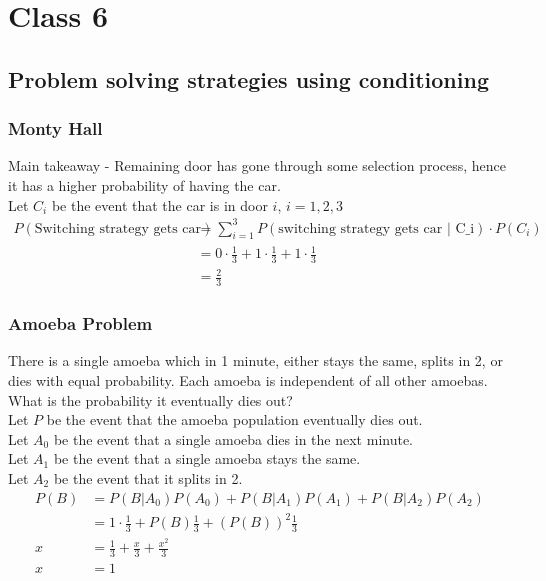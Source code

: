 \chapter{Class 6}

\section{Problem solving strategies using conditioning}

\subsection{Monty Hall}

Main takeaway - Remaining door has gone through some selection process, hence it has a higher probability of having the car. \\

Let $C_i$ be the event that the car is in door $i$, $i = 1, 2, 3$
\begin{align*}
   P(\text{Switching strategy gets car}) &= \sum_{i = 1}^{3}P(\text{switching strategy gets car | C_i}) \cdot P(C_i) \\
                                         &= 0 \cdot \frac{1}{3} + 1 \cdot \frac{1}{3} + 1 \cdot \frac{1}{3} \\
                                         &= \frac{2}{3}
\end{align*}

\subsection{Amoeba Problem}

There is a single amoeba which in 1 minute, either stays the same, splits in 2, or dies with equal probability. Each amoeba is independent of all other amoebas. What is the probability it eventually dies out? \\

Let $P$ be the event that the amoeba population eventually dies out. \\
Let $A_0$ be the event that a single amoeba dies in the next minute. \\
Let $A_1$ be the event that a single amoeba stays the same. \\ 
Let $A_2$ be the event that it splits in 2. \\

\begin{align*}
   P(B) &= P(B|A_0) P(A_0) + P(B | A_1) P(A_1) + P(B | A_2) P(A_2) \\ 
        &= 1 \cdot \frac{1}{3} + P(B) \frac{1}{3} + (P(B))^2 \frac{1}{3} \\
   x &= \frac{1}{3} + \frac{x}{3} + \frac{x^2}{3} \\
   x &= 1
\end{align*}

